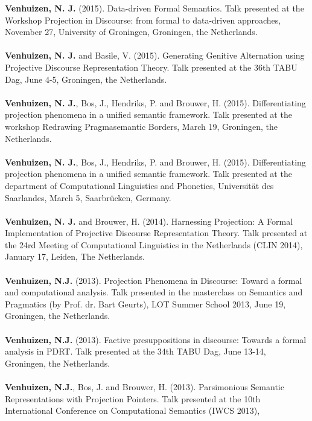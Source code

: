 \documentclass[a4paper,10pt]{article}
\begin{document}
\noindent
    \textbf{Venhuizen, N. J.} (2015). Data-driven Formal Semantics. Talk
    presented at the Workshop Projection in Discourse: from formal to
    data-driven approaches, November 27, University of Groningen, Groningen,
    the Netherlands.\\
    \\
    \textbf{Venhuizen, N. J.} and Basile, V. (2015). Generating Genitive
    Alternation using Projective Discourse Representation Theory.
    Talk presented at the 36th TABU Dag, June 4-5, Groningen, the Netherlands.\\
    \\
    \textbf{Venhuizen, N. J.}, Bos, J., Hendriks, P. and Brouwer, H. (2015). 
    Differentiating projection phenomena in a unified semantic framework.
    Talk presented at the workshop Redrawing Pragmasemantic Borders,
    March 19, Groningen, the Netherlands.\\
    \\
    \textbf{Venhuizen, N. J.}, Bos, J., Hendriks, P. and Brouwer, H. (2015). 
    Differentiating projection phenomena in a unified semantic framework.
    Talk presented at the department of Computational Linguistics and Phonetics,
    Universit{\"a}t des Saarlandes, March 5, Saarbr{\"u}cken, Germany.\\
    \\
    \textbf{Venhuizen, N. J.} and Brouwer, H. (2014). Harnessing Projection: A Formal
    Implementation of Projective Discourse Representation Theory. Talk
    presented at the 24rd Meeting of Computational Linguistics in the
    Netherlands (CLIN 2014), January 17, Leiden, The Netherlands.\\
    \\
    \textbf{Venhuizen, N.J.} (2013). Projection Phenomena in Discourse: Toward
    a formal and computational analysis. Talk
    presented in the masterclass on Semantics and Pragmatics (by Prof. dr. Bart
    Geurts), LOT Summer School 2013, June 19, Groningen, the Netherlands.\\
    \\
    \textbf{Venhuizen, N.J.} (2013). Factive presuppositions in discourse:
    Towards a formal analysis in PDRT. Talk presented at the 34th TABU Dag,
    June 13-14, Groningen, the Netherlands.\\
    \\
    \textbf{Venhuizen, N.J.}, Bos, J. and Brouwer, H. (2013). Parsimonious 
    Semantic Representations with Projection Pointers. Talk presented at
    the 10th International Conference on Computational Semantics (IWCS 2013),
\end{document}
